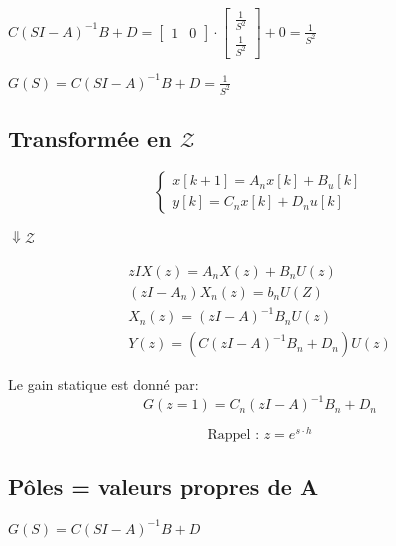 \documentclass[document.tex]{subfiles}
\begin{document}
\begin{center}
$ C(SI-A)^{-1}B + D = \begin{bmatrix} 1 & 0 \end{bmatrix} \cdot \begin{bmatrix} \frac{1}{S^2} \\ \frac{1}{S^2} \end{bmatrix} + 0 = \frac{1}{S^2} $
\end{center}

\begin{center}
	$ \boxed{G(S) = C(SI-A)^{-1}B + D = \frac{1}{S^2}} $
\end{center}
	

\subsection{Transformée en $\mathscr{Z}$}

\begin{equation}
	\begin{cases}
		x[k+1] = A_nx[k] +B_u[k] \\
		y[k] = C_nx[k] + D_nu[k] 
	\end{cases}
\end{equation}
\begin{center}
$\Downarrow \mathscr{Z}$
\end{center}

\begin{equation}
\begin{array}{c}
	z I X(z) = A_n X(z) + B_n U(z) \\[6pt]
	(z I - A_n)X_n(z) = b_n U(Z) \\[6pt]
	X_n(z) = (zI-A)^{-1} B_nU(z) \\	[6pt]
	Y(z) = (C(zI-A)^{-1}B_n + D_n)U(z)
\end{array}
\end{equation}

Le gain statique est donné par: \\
\begin{equation}
	\boxed{G(z = 1)=C_n(zI-A)^{-1}B_n + D_n}
\end{equation}

\begin{equation}
	\boxed{\text{Rappel : }z = e^{s \cdot h}}
\end{equation}

\subsection{Pôles = valeurs propres de A}
\begin{center}
	$\boxed{G(S) = C(SI-A)^{-1}B + D}$ \\
\end{center}
\end{document}
